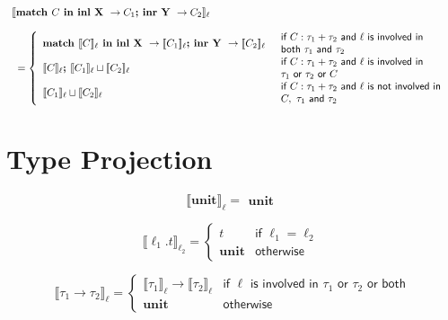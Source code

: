 \documentclass{article}
\begin{document}
$$\begin{array}{l}
 \llbracket  \textbf{match } C \textbf{ in inl X } \to C_1 \textbf{; inr Y } \to C_2 \rrbracket _\ell\\ \\ \;\;= \left\{
    \begin{array}{l l}
    \textbf{match }\llbracket C \rrbracket _\ell \textbf{ in inl X } \to \llbracket C_1 \rrbracket _\ell \textbf{; inr Y } \to \llbracket C_2 \rrbracket _\ell & 
    \begin{array}{l}
    \textsf{if } C : \tau_1 + \tau_2 \textsf{ and } \ell \textsf{ is involved in} \\ \textsf{both } \tau_1 \textsf{ and }\tau_2 
    \end{array}    \\
    \llbracket C \rrbracket _\ell \textbf{; } \llbracket C_1 \rrbracket _\ell \sqcup \llbracket C_2 \rrbracket _\ell & 
    \begin{array}{l}
    \textsf{if } C : \tau_1 + \tau_2 \textsf{ and } \ell \textsf{ is involved in } \\ \tau_1 \textsf{ or } \tau_2 \textsf{ or } C
    \end{array}    \\
    \llbracket C_1 \rrbracket _\ell \sqcup \llbracket C_2 \rrbracket _\ell & 
    \begin{array}{l}
    \textsf{if } C : \tau_1 + \tau_2 \textsf{ and } \ell \textsf{ is not involved in} \\ C, \ \tau_1 \textsf{ and } \tau_2 
    \end{array}
    \end{array}
\right.
\end{array}
$$

\section{Type Projection} 
$$
 \llbracket  \textbf{unit} \rrbracket _\ell =
    \begin{array}{ll}
    \textbf{unit}
    \end{array}
$$

$$
 \llbracket  \ell_1 . t \rrbracket _{\ell_2} = \left\{
    \begin{array}{ll}
    t & \textsf{if } \ell_1 = \ell_2 \\
    \textbf{unit} & \textsf{otherwise}
    \end{array}
\right.
$$

$$
 \llbracket  \tau_1 \to \tau_2 \rrbracket _\ell = \left\{
    \begin{array}{ll}
    \llbracket  \tau_1 \rrbracket _\ell \to \llbracket  \tau_2 \rrbracket _\ell & \textsf{if } \ell \textsf{ is involved in } \tau_1 \textsf{ or } \tau_2 \textsf{ or both}\\
    \textbf{unit} & \textsf{otherwise}
    \end{array}
\right.
$$
\end{document}
